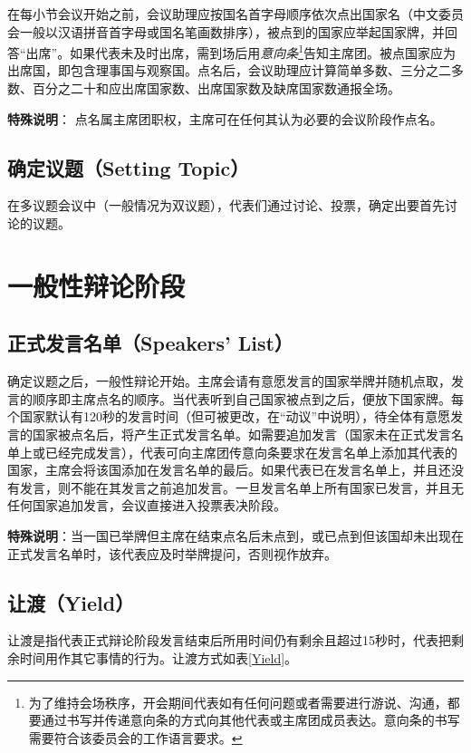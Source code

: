 \documentclass[a4paper,openany]{book}
\begin{document}
在每小节会议开始之前，会议助理应按国名首字母顺序依次点出国家名（中文委员会一般以汉语拼音首字母或国名笔画数排序），被点到的国家应举起国家牌，并回答“出席”。如果代表未及时出席，需到场后用\textit{意向条}\footnote{为了维持会场秩序，开会期间代表如有任何问题或者需要进行游说、沟通，都要通过书写并传递意向条的方式向其他代表或主席团成员表达。意向条的书写需要符合该委员会的工作语言要求。}告知主席团。被点国家应为出席国，即包含理事国与观察国。点名后，会议助理应计算简单多数、三分之二多数、百分之二十和应出席国家数、出席国家数及缺席国家数通报全场。

\textbf{特殊说明}： 点名属主席团职权，主席可在任何其认为必要的会议阶段作点名。

\subsection{确定议题（Setting Topic）}

在多议题会议中（一般情况为双议题），代表们通过讨论、投票，确定出要首先讨论的议题。

\section{一般性辩论阶段}

\subsection{正式发言名单（Speakers’ List）}

确定议题之后，一般性辩论开始。主席会请有意愿发言的国家举牌并随机点取，发言的顺序即主席点名的顺序。当代表听到自己国家被点到之后，便放下国家牌。每个国家默认有120秒的发言时间（但可被更改，在“动议”中说明），待全体有意愿发言的国家被点名后，将产生正式发言名单。如需要追加发言（国家未在正式发言名单上或已经完成发言），代表可向主席团传意向条要求在发言名单上添加其代表的国家，主席会将该国添加在发言名单的最后。如果代表已在发言名单上，并且还没有发言，则不能在其发言之前追加发言。一旦发言名单上所有国家已发言，并且无任何国家追加发言，会议直接进入投票表决阶段。

\textbf{特殊说明}：当一国已举牌但主席在结束点名后未点到，或已点到但该国却未出现在正式发言名单时，该代表应及时举牌提问，否则视作放弃。

\subsection{让渡（Yield）}

让渡是指代表正式辩论阶段发言结束后所用时间仍有剩余且超过15秒时，代表把剩余时间用作其它事情的行为。让渡方式如表\ref{Yield}。
\end{document}
